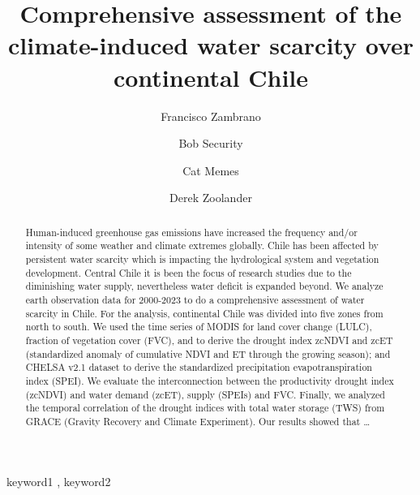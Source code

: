 \documentclass[preprint,
3p]{elsarticle} %
\begin{document}
\begin{frontmatter}

  \title{Comprehensive assessment of the climate-induced water scarcity
over continental Chile}
    \author[Hemera Centro de Observación de la Tierra,Universidad
Mayor]{Francisco Zambrano%
  }
    \author[Another University]{Bob Security%
  }
    \author[Another University]{Cat Memes%
  }
    \author[Some Institute of Technology]{Derek Zoolander%
  }
  
  \begin{abstract}
  Human-induced greenhouse gas emissions have increased the frequency
  and/or intensity of some weather and climate extremes globally. Chile
  has been affected by persistent water scarcity which is impacting the
  hydrological system and vegetation development. Central Chile it is
  been the focus of research studies due to the diminishing water
  supply, nevertheless water deficit is expanded beyond. We analyze
  earth observation data for 2000-2023 to do a comprehensive assessment
  of water scarcity in Chile. For the analysis, continental Chile was
  divided into five zones from north to south. We used the time series
  of MODIS for land cover change (LULC), fraction of vegetation cover
  (FVC), and to derive the drought index zcNDVI and zcET (standardized
  anomaly of cumulative NDVI and ET through the growing season); and
  CHELSA v2.1 dataset to derive the standardized precipitation
  evapotranspiration index (SPEI). We evaluate the interconnection
  between the productivity drought index (zcNDVI) and water demand
  (zcET), supply (SPEIs) and FVC. Finally, we analyzed the temporal
  correlation of the drought indices with total water storage (TWS) from
  GRACE (Gravity Recovery and Climate Experiment). Our results showed
  that \ldots{}
  \end{abstract}
    \begin{keyword}
    keyword1 \sep 
    keyword2
  \end{keyword}
  
 \end{frontmatter}
\end{document}
